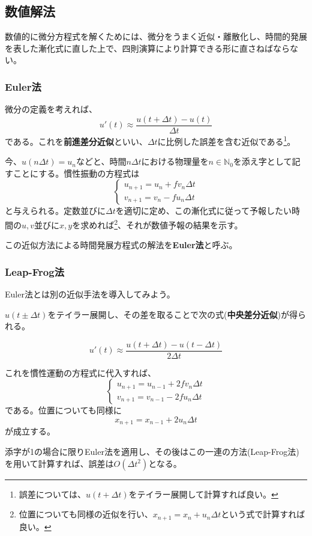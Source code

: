 \documentclass{jsarticle}
\begin{document}
\subsection{数値解法}
数値的に微分方程式を解くためには、微分をうまく近似・離散化し、時間的発展を表した漸化式に直した上で、四則演算により計算できる形に直さねばならない。

\subsubsection{Euler法}
微分の定義を考えれば、
\[
u'(t)\approx \frac{u(t+\Delta t)-u(t)}{\Delta t}
\]
である。これを\textbf{前進差分近似}といい、$\Delta t$に比例した誤差を含む近似である\footnote{誤差については、$u(t+\Delta t)$をテイラー展開して計算すれば良い。}。

今、$u(n\Delta t)=u_n$などと、時間$n\Delta t$における物理量を$n\in \mathbb{N}_0$を添え字として記すことにする。慣性振動の方程式は
\[
\left\{
\begin{array}{l}
u_{n+1}=u_n+fv_n\Delta t \\
v_{n+1}=v_n-fu_n\Delta t
\end{array}
\right.
\]
と与えられる。定数並びに$\Delta t$を適切に定め、この漸化式に従って予報したい時間の$u,v$並びに$x,y$を求めれば\footnote{位置についても同様の近似を行い、$x_{n+1}=x_n+u_n \Delta t$という式で計算すれば良い。}、それが数値予報の結果を示す。

この近似方法による時間発展方程式の解法を\textbf{Euler法}と呼ぶ。

\subsubsection{Leap-Frog法}
Euler法とは別の近似手法を導入してみよう。

$u(t\pm \Delta t)$をテイラー展開し、その差を取ることで次の式(\textbf{中央差分近似})が得られる。

\[
u'(t)\approx \frac{u(t+\Delta t)-u(t-\Delta t)}{2 \Delta t}
\]

これを慣性運動の方程式に代入すれば、
\[
\left\{
\begin{array}{l}
u_{n+1}=u_{n-1}+2fv_n\Delta t \\
v_{n+1}=v_{n-1}-2fu_n\Delta t
\end{array}
\right.
\]
である。位置についても同様に
\[
x_{n+1}=x_{n-1}+2u_n\Delta t
\]
が成立する。

添字が1の場合に限りEuler法を適用し、その後はこの一連の方法(Leap-Frog法)を用いて計算すれば、誤差は$O(\Delta t^2)$となる。
\end{document}
